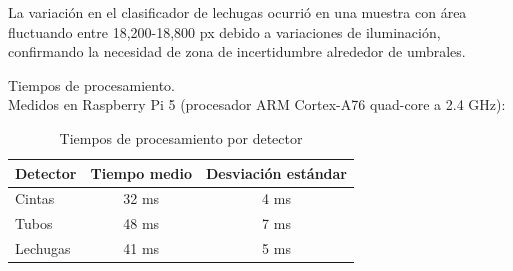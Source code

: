 \noindent
La variación en el clasificador de lechugas ocurrió en una muestra con área fluctuando entre 18,200-18,800 px debido a variaciones de iluminación, confirmando la necesidad de zona de incertidumbre alrededor de umbrales.

Tiempos de procesamiento.\\
\noindent
Medidos en Raspberry Pi 5 (procesador ARM Cortex-A76 quad-core a 2.4 GHz):

\begin{table}[H]
\centering
\begin{tabular}{|l|c|c|}
\hline
\textbf{Detector} & \textbf{Tiempo medio} & \textbf{Desviación estándar} \\ \hline
Cintas & 32 ms & 4 ms \\ \hline
Tubos & 48 ms & 7 ms \\ \hline
Lechugas & 41 ms & 5 ms \\ \hline
\end{tabular}
\caption{Tiempos de procesamiento por detector}
\label{tab:tiempos_procesamiento}
\end{table}